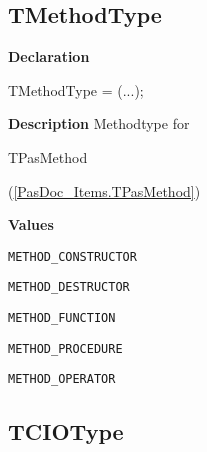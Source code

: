 \documentclass{report}
\newif\ifpdf
\begin{document}
\subsection*{TMethodType}
\fi
\label{PasDoc_Items-TMethodType}
\begin{list}{}{
\setlength{\itemindent}{0cm}
\setlength{\listparindent}{0cm}
\setlength{\leftmargin}{\evensidemargin}
\addtolength{\leftmargin}{\tmplength}
\settowidth{\labelsep}{X}
\addtolength{\leftmargin}{\labelsep}
\setlength{\labelwidth}{\tmplength}
}
\item[\textbf{Declaration}\hfill]
\ifpdf
\begin{flushleft}
\fi
\begin{ttfamily}
TMethodType = (...);\end{ttfamily}

\ifpdf
\end{flushleft}
\fi

\par
\item[\textbf{Description}]
Methodtype for \begin{ttfamily}TPasMethod\end{ttfamily}(\ref{PasDoc_Items.TPasMethod})\item[\textbf{Values}]
\begin{description}
\item[\texttt{METHOD{\_}CONSTRUCTOR}] \label{PasDoc_Items-METHOD_CONSTRUCTOR}
\index{}
 
\item[\texttt{METHOD{\_}DESTRUCTOR}] \label{PasDoc_Items-METHOD_DESTRUCTOR}
\index{}
 
\item[\texttt{METHOD{\_}FUNCTION}] \label{PasDoc_Items-METHOD_FUNCTION}
\index{}
 
\item[\texttt{METHOD{\_}PROCEDURE}] \label{PasDoc_Items-METHOD_PROCEDURE}
\index{}
 
\item[\texttt{METHOD{\_}OPERATOR}] \label{PasDoc_Items-METHOD_OPERATOR}
\index{}
 
\end{description}


\end{list}
\ifpdf
\subsection*{\large{\textbf{TCIOType}}\normalsize\hspace{1ex}\hrulefill}
\else
\end{document}
